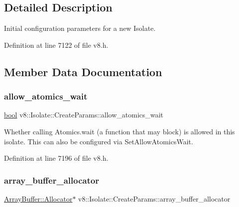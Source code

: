 \subsection{Detailed Description}
Initial configuration parameters for a new Isolate. 

Definition at line 7122 of file v8.\+h.



\subsection{Member Data Documentation}
\mbox{\label{structv8_1_1Isolate_1_1CreateParams_acade19de0f78ff15d76aaef2e292da72}} 
\subsubsection{\texorpdfstring{allow\+\_\+atomics\+\_\+wait}{allow\_atomics\_wait}}
{\footnotesize\ttfamily \mbox{\hyperlink{classbool}{bool}} v8\+::\+Isolate\+::\+Create\+Params\+::allow\+\_\+atomics\+\_\+wait}

Whether calling Atomics.\+wait (a function that may block) is allowed in this isolate. This can also be configured via Set\+Allow\+Atomics\+Wait. 

Definition at line 7196 of file v8.\+h.

\mbox{\label{structv8_1_1Isolate_1_1CreateParams_a7c663f70b64290392eeaf164f57585f9}} 
\subsubsection{\texorpdfstring{array\+\_\+buffer\+\_\+allocator}{array\_buffer\_allocator}}
{\footnotesize\ttfamily \mbox{\hyperlink{classv8_1_1ArrayBuffer_1_1Allocator}{Array\+Buffer\+::\+Allocator}}$\ast$ v8\+::\+Isolate\+::\+Create\+Params\+::array\+\_\+buffer\+\_\+allocator}

